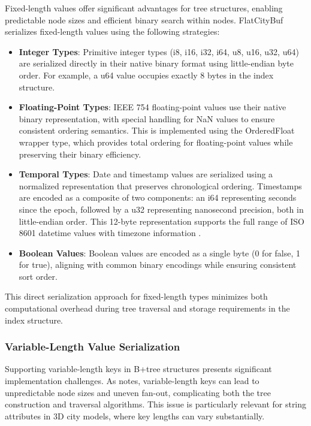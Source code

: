 Fixed-length values offer significant advantages for tree structures, enabling predictable node sizes and efficient binary search within nodes. FlatCityBuf serializes fixed-length values using the following strategies:

\begin{itemize}
  \item \textbf{Integer Types}: Primitive integer types (i8, i16, i32, i64, u8, u16, u32, u64) are serialized directly in their native binary format using little-endian byte order. For example, a u64 value occupies exactly 8 bytes in the index structure.

  \item \textbf{Floating-Point Types}: IEEE 754 floating-point values \citep{ieee_754_2023} use their native binary representation, with special handling for NaN values to ensure consistent ordering semantics. This is implemented using the OrderedFloat wrapper type, which provides total ordering for floating-point values while preserving their binary efficiency.

  \item \textbf{Temporal Types}: Date and timestamp values are serialized using a normalized representation that preserves chronological ordering. Timestamps are encoded as a composite of two components: an i64 representing seconds since the epoch, followed by a u32 representing nanosecond precision, both in little-endian order. This 12-byte representation supports the full range of ISO 8601 datetime values with timezone information \citep{iso_8601_2023}.

  \item \textbf{Boolean Values}: Boolean values are encoded as a single byte (0 for false, 1 for true), aligning with common binary encodings while ensuring consistent sort order.
\end{itemize}

This direct serialization approach for fixed-length types minimizes both computational overhead during tree traversal and storage requirements in the index structure.

\subsubsection{Variable-Length Value Serialization}
\label{methodology:attribute_index:variable_length_serialization}

Supporting variable-length keys in B+tree structures presents significant implementation challenges. As \citet{ramez_2015} notes, variable-length keys can lead to unpredictable node sizes and uneven fan-out, complicating both the tree construction and traversal algorithms. This issue is particularly relevant for string attributes in 3D city models, where key lengths can vary substantially.

